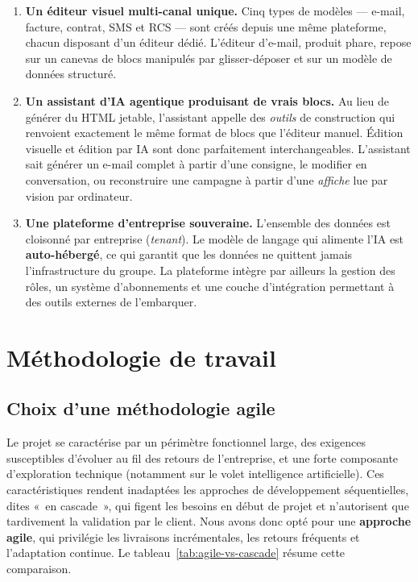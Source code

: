\begin{enumerate}[leftmargin=1.4cm]
  \item \textbf{Un éditeur visuel multi-canal unique.} Cinq types de
  modèles — e-mail, facture, contrat, SMS et RCS — sont créés depuis une
  même plateforme, chacun disposant d'un éditeur dédié. L'éditeur d'e-mail,
  produit phare, repose sur un canevas de blocs manipulés par
  glisser-déposer et sur un modèle de données structuré.

  \item \textbf{Un assistant d'IA agentique produisant de vrais blocs.} Au
  lieu de générer du HTML jetable, l'assistant appelle des \emph{outils} de
  construction qui renvoient exactement le même format de blocs que
  l'éditeur manuel. Édition visuelle et édition par IA sont donc
  parfaitement interchangeables. L'assistant sait générer un e-mail complet
  à partir d'une consigne, le modifier en conversation, ou reconstruire une
  campagne à partir d'une \emph{affiche} lue par vision par ordinateur.

  \item \textbf{Une plateforme d'entreprise souveraine.} L'ensemble des
  données est cloisonné par entreprise (\emph{tenant}). Le modèle de langage
  qui alimente l'IA est \textbf{auto-hébergé}, ce qui garantit que les
  données ne quittent jamais l'infrastructure du groupe. La plateforme
  intègre par ailleurs la gestion des rôles, un système d'abonnements et
  une couche d'intégration permettant à des outils externes de l'embarquer.
\end{enumerate}

\section{Méthodologie de travail}

\subsection{Choix d'une méthodologie agile}
Le projet se caractérise par un périmètre fonctionnel large, des exigences
susceptibles d'évoluer au fil des retours de l'entreprise, et une forte
composante d'exploration technique (notamment sur le volet intelligence
artificielle). Ces caractéristiques rendent inadaptées les approches de
développement séquentielles, dites «~en cascade~», qui figent les besoins
en début de projet et n'autorisent que tardivement la validation par le
client. Nous avons donc opté pour une \textbf{approche agile}, qui privilégie
les livraisons incrémentales, les retours fréquents et l'adaptation
continue. Le tableau~\ref{tab:agile-vs-cascade} résume cette comparaison.


